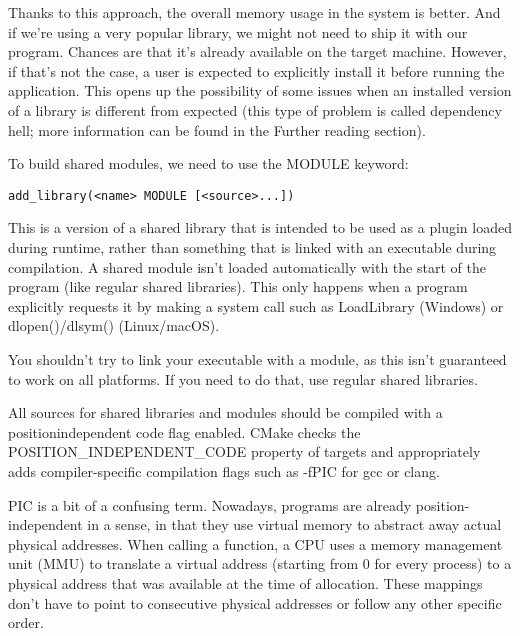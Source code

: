 Thanks to this approach, the overall memory usage in the system is better. And if we're using a very popular library, we might not need to ship it with our program. Chances are that it's already available on the target machine. However, if that's not the case, a user is expected to explicitly install it before running the application. This opens up the possibility of some issues when an installed version of a library is different from expected (this type of problem is called dependency hell; more information can be found in the Further reading section).


To build shared modules, we need to use the MODULE keyword:

\begin{lstlisting}[style=styleCMake]
add_library(<name> MODULE [<source>...])
\end{lstlisting}

This is a version of a shared library that is intended to be used as a plugin loaded during runtime, rather than something that is linked with an executable during compilation. A shared module isn't loaded automatically with the start of the program (like regular shared libraries). This only happens when a program explicitly requests it by making a system call such as LoadLibrary (Windows) or dlopen()/dlsym() (Linux/macOS).

You shouldn't try to link your executable with a module, as this isn't guaranteed to work on all platforms. If you need to do that, use regular shared libraries.


All sources for shared libraries and modules should be compiled with a positionindependent code flag enabled. CMake checks the POSITION\_INDEPENDENT\_CODE property of targets and appropriately adds compiler-specific compilation flags such as -fPIC for gcc or clang.

PIC is a bit of a confusing term. Nowadays, programs are already position-independent in a sense, in that they use virtual memory to abstract away actual physical addresses. When calling a function, a CPU uses a memory management unit (MMU) to translate a virtual address (starting from 0 for every process) to a physical address that was available at the time of allocation. These mappings don't have to point to consecutive physical addresses or follow any other specific order.

